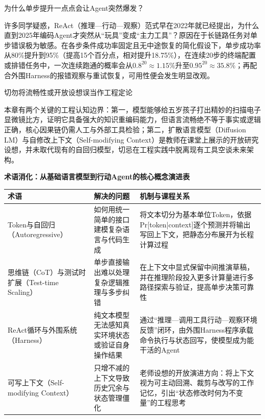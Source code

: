\documentclass[UTF8,a4paper,11pt,fontset=fandol]{ctexart}
\begin{document}
\begin{knowledgebox}{为什么单步提升一点点会让Agent突然爆发？}

许多同学疑惑，ReAct（推理—行动—观察）范式早在2022年就已经提出，为什么直到2025年编码Agent才突然从“玩具”变成“主力工具”？原因在于长链路任务对单步错误极为敏感。在各步条件成功率固定且无中途恢复的简化假设下，单步成功率从80\%提升到95\%（提高15个百分点，相对提升18.75\%），在连续20步的终端配置或排错任务中，一次连续跑通的概率会从\(0.8^{20}\approx 1.15\%\)升至\(0.95^{20}\approx 35.8\%\)；再配合外围Harness的报错观察与重试恢复，可用性便会发生明显改观。

\end{knowledgebox}

\begin{warningbox}{切勿将流畅性或开放设想误当作工程定论}

本章有两个关键的工程认知边界：第一，模型能够给五岁孩子打出精妙的扫描电子显微镜比方，证明它具备强大的知识重编码能力，但语言流畅绝不等于事实或逻辑正确，核心因果链仍需人工与外部工具检验；第二，扩散语言模型（Diffusion LM）与自修改上下文（Self-modifying Context）是教师在课堂上展示的开放研究设想，并未取代现有的自回归模型，切忌在工程实践中脱离现有工具空谈未来架构。

\end{warningbox}

\par{}\textbf{术语消化：从基础语言模型到行动Agent的核心概念演进表}

\begin{center}\small\begin{tabularx}{\linewidth}{YYY}

\toprule

术语 & 解决的问题 & 机制与课程关系\\\midrule

Token与自回归（Autoregressive） & 如何用统一简单的接口建模复杂语言与代码生成 & 将文本切分为基本单位Token，依据Pr[token|context]逐个预测并将输出写回上下文，把静态分布展开为长程计算过程\\[3pt]

思维链（CoT）与测试时扩展（Test-time Scaling） & 单步直接输出难以处理复杂逻辑推理与多步纠错 & 在上下文中显式保留中间推演草稿，并在推理阶段投入更多计算量进行多路径探索与验证，提高单步决策可靠性\\[3pt]

ReAct循环与外围系统（Harness） & 纯文本模型无法感知真实环境状态或验证自身操作结果 & 通过“推理—调用工具行动—观察环境反馈”闭环，由外围Harness程序承载命令执行与状态回写，使模型成为能干活的Agent\\[3pt]

可写上下文（Self-modifying Context） & 只增不减的上下文导致历史冗余与状态管理僵化 & 老师设想的开放演进方向：将上下文视为可主动回溯、裁剪与改写的工作记忆，引出“状态修改时何为不变量”的工程思考\\[3pt]

\bottomrule\end{tabularx}\end{center}
\end{document}
